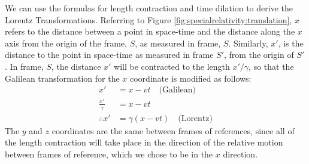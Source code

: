 We can use the formulas for length contraction and time dilation to derive the Lorentz Transformations. Referring to Figure \ref{fig:specialrelativity:translation}, $x$ refers to the distance between a point in space-time and the distance along the $x$ axis from the origin of the frame, $S$, as measured in frame, $S$. Similarly, $x'$, is the distance to the point in space-time as measured in frame $S'$, from the origin of $S'$. In frame, $S$, the distance $x'$ will be contracted to the length $x'/\gamma$, so that the Galilean transformation for the $x$ coordinate is modified as follows:
\begin{align*}
x' &= x - vt\quad\text{(Galilean)}\\
\frac{x'}{\gamma} &= x - vt\\
\therefore x'&=\gamma (x-vt)\quad\text{(Lorentz)}
\end{align*}
The $y$ and $z$ coordinates are the same between frames of references, since all of the length contraction will take place in the direction of the relative motion between frames of reference, which we chose to be in the $x$ direction.

